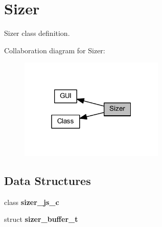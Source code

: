 \section{Sizer}
\label{group___sizer}


Sizer class definition.  


Collaboration diagram for Sizer\+:
\nopagebreak
\begin{figure}[H]
\begin{center}
\leavevmode
\includegraphics[width=196pt]{group___sizer}
\end{center}
\end{figure}
\subsection*{Data Structures}
\begin{DoxyCompactItemize}
\item 
class \textbf{ sizer\+\_\+js\+\_\+c}
\item 
struct \textbf{ sizer\+\_\+buffer\+\_\+t}
\end{DoxyCompactItemize}
